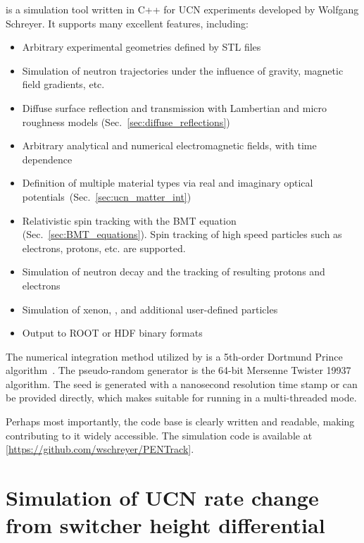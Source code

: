 
\pentrack \cite{schreyer_pentrack} is a simulation tool written in C++ for UCN experiments developed by Wolfgang Schreyer. It supports many excellent features, including:
%
\begin{itemize}
    \item Arbitrary experimental geometries defined by STL files
    \item Simulation of neutron trajectories under the influence of gravity, magnetic field gradients, etc.
    \item Diffuse surface reflection and transmission with Lambertian and micro roughness models (Sec.~\ref{sec:diffuse_reflections})
    \item Arbitrary analytical and numerical electromagnetic fields, with time dependence
    \item Definition of multiple material types via real and imaginary optical potentials~(Sec.~\ref{sec:ucn_matter_int})
    \item Relativistic spin tracking with the BMT equation (Sec.~\ref{sec:BMT_equations}). Spin tracking of high speed particles such as electrons, protons, etc. are supported.
    \item Simulation of neutron decay and the tracking of resulting protons and electrons
    \item Simulation of xenon, \hg, and additional user-defined particles
    \item Output to ROOT or HDF binary formats
\end{itemize}
%
The numerical integration method utilized by \pentrack is a 5th-order Dortmund Prince algorithm~\cite{numerical_recipes}. The pseudo-random generator is the 64-bit Mersenne Twister 19937 algorithm. The seed is generated with a nanosecond resolution time stamp or can be provided directly, which makes \pentrack suitable for running in a multi-threaded mode.

Perhaps most importantly, the \pentrack code base is clearly written and readable, making contributing to it widely accessible. The simulation code is available at [\url{https://github.com/wschreyer/PENTrack}].


\section{Simulation of UCN rate change from switcher height differential}\label{sec:switcher_height_monte_carlo}

